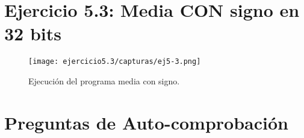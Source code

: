 \newpage

\section{Ejercicio 5.3: Media CON signo en 32 bits}



\begin{figure}[H] %
	\centering
	\texttt{[image: ejercicio5.3/capturas/ej5-3.png]}  
	\caption{Ejecución del programa media con signo.} 
	\label{fig:figura3}
\end{figure}

\newpage

\section{Preguntas de Auto-comprobación}
